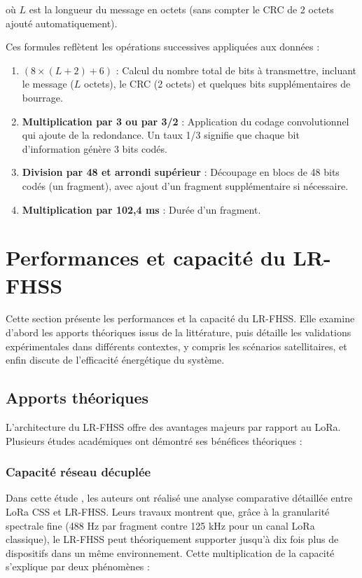 où $L$ est la longueur du message en octets (sans compter le CRC de 2 octets ajouté automatiquement).

Ces formules reflètent les opérations successives appliquées aux données :

\begin{enumerate}
	\item \textbf{$(8 \times (L + 2) + 6)$} : Calcul du nombre total de bits à transmettre, incluant le message ($L$ octets), le CRC (2 octets) et quelques bits supplémentaires de bourrage.
	
	\item \textbf{Multiplication par 3 ou par 3/2} : Application du codage convolutionnel qui ajoute de la redondance. Un taux 1/3 signifie que chaque bit d'information génère 3 bits codés.
	
	\item \textbf{Division par 48 et arrondi supérieur} : Découpage en blocs de 48 bits codés (un fragment), avec ajout d'un fragment supplémentaire si nécessaire.
	
	\item \textbf{Multiplication par 102,4 ms} : Durée d'un fragment.
\end{enumerate}

\section{Performances et capacité du LR-FHSS}
Cette section présente les performances et la capacité du LR-FHSS. Elle examine d’abord les apports théoriques issus de la littérature, puis détaille les validations expérimentales dans différents contextes, y compris les scénarios satellitaires, et enfin discute de l’efficacité énergétique du système.

\subsection{Apports théoriques}

L'architecture du LR-FHSS offre des avantages majeurs par rapport au LoRa. Plusieurs études académiques ont démontré ses bénéfices théoriques :

\subsubsection{Capacité réseau décuplée}

Dans cette étude \cite{lr_fhss_overview}, les auteurs ont réalisé une analyse comparative détaillée entre LoRa CSS et LR-FHSS. Leurs travaux montrent que, grâce à la granularité spectrale fine (488 Hz par fragment contre 125 kHz pour un canal LoRa classique), le LR-FHSS peut théoriquement supporter jusqu'à dix fois plus de dispositifs dans un même environnement. Cette multiplication de la capacité s'explique par deux phénomènes :

